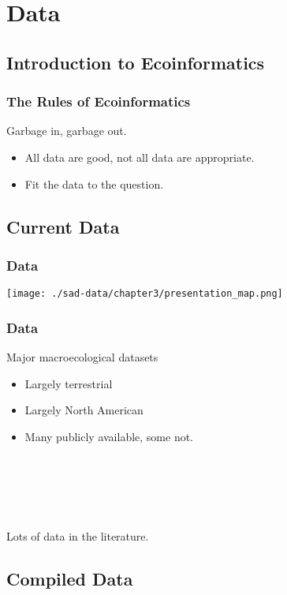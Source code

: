 \documentclass[14pt]{beamer}
\begin{document}
\section{Data}
\subsection{Introduction to Ecoinformatics}
\begin{frame}[t]
\frametitle{The Rules of Ecoinformatics}
\begin{Large}
Garbage in, garbage out.\\
\end{Large}
\begin{itemize}
\item All data are good, not all data are appropriate.
\item Fit the data to the question.
\end{itemize}
\end{frame}

\subsection{Current Data}
\begin{frame}[t]
\frametitle{Data}
\vspace{-7pt}
\texttt{[image: ./sad-data/chapter3/presentation\_map.png]}
\end{frame}

\begin{frame}[t]{}
\frametitle{Data}
\begin{large}
Major macroecological datasets\\
\end{large}
\begin{itemize}
\item Largely terrestrial
\item Largely North American
\item Many publicly available, some not.
\end{itemize}
~\\
~\\
~\\
~\\
\begin{large}
Lots of data in the literature.\\
\end{large}
\end{frame}



\subsection{Compiled Data}
\end{document}
